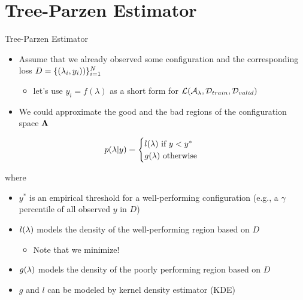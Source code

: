 \section{Tree-Parzen Estimator}
\begin{frame}[c,fragile]{Tree-Parzen Estimator }

\begin{itemize}
	\item Assume that we already observed some configuration and the corresponding loss $D = \{(\mathbf{\lambda}_i, y_i))\}_{i=1}^N$
	\begin{itemize}
		\item let's use $y_i = f(\lambda)$ as a short form for $\mathcal{L}(\mathcal{A}_{\mathbf{\lambda}}, \mathcal{D}_{train}, \mathcal{D}_{valid})$
	\end{itemize}
	\pause
	\item We could approximate the good and the bad regions of the configuration space $\mathbf{\Lambda}$
\end{itemize}

$$
p(\mathbf{\lambda}|y) = \begin{cases}
l(\mathbf{\lambda}) \text{ if } y < y^*\\
g(\mathbf{\lambda}) \text{ otherwise} 
\end{cases}
$$

where 
\begin{itemize}
	\item $y^*$ is an empirical threshold for a well-performing configuration (e.g., a $\gamma$ percentile of all observed $y$ in $D$)
	\item $l(\mathbf{\lambda})$ models the density of the well-performing region based on $D$
	\begin{itemize}
		\item Note that we minimize!
	\end{itemize}
	\item $g(\mathbf{\lambda})$ models the density of the poorly performing region based on $D$
	\item $g$ and $l$ can be modeled by kernel density estimator (KDE)
\end{itemize}

\end{frame}
